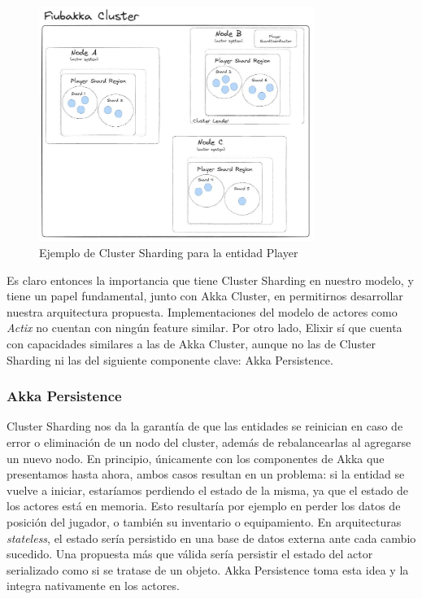 \begin{figure}[htbp]
    \centering
    \includegraphics[width=0.8\textwidth]{../assets/cluster-sharding-example.jpeg}
    \caption{Ejemplo de Cluster Sharding para la entidad Player}
\end{figure}

Es claro entonces la importancia que tiene Cluster Sharding en nuestro modelo, y tiene un papel fundamental, junto con Akka Cluster, en permitirnos desarrollar nuestra arquitectura
propuesta. Implementaciones del modelo de actores como \textit{Actix} no cuentan con ningún feature similar. Por otro lado, Elixir sí que cuenta con capacidades similares a las de Akka
Cluster, aunque no las de Cluster Sharding ni las del siguiente componente clave: Akka Persistence.

\subsubsection{Akka Persistence}

\noindent Cluster Sharding nos da la garantía de que las entidades se reinician en caso de error o eliminación de un nodo del cluster, además de rebalancearlas al agregarse un nuevo
nodo. En principio, únicamente con los componentes de Akka que presentamos hasta ahora, ambos casos resultan en un problema: si la entidad se vuelve a iniciar, estaríamos perdiendo el estado
de la misma, ya que el estado de los actores está en memoria. Esto resultaría por ejemplo en perder los datos de posición del jugador, o también su inventario o equipamiento.
En arquitecturas \textit{stateless}, el estado sería persistido en una base de datos externa ante cada cambio sucedido.
Una propuesta más que válida sería persistir el estado del actor serializado como si se tratase de un objeto. Akka Persistence toma esta idea y la integra nativamente en los actores. 

